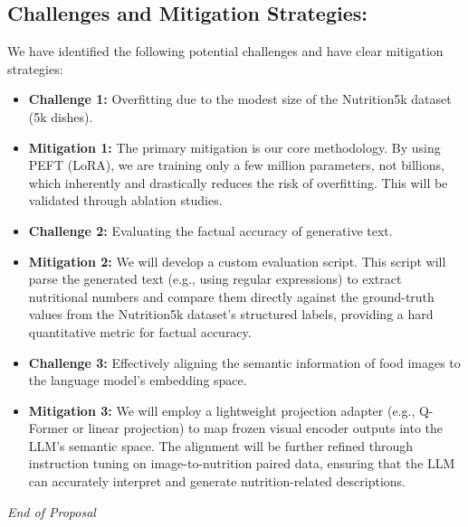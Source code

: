 \documentclass{article}
\begin{document}
\subsection{Challenges and Mitigation Strategies:}
We have identified the following potential challenges and have clear mitigation strategies:
\begin{itemize}
    \item \textbf{Challenge 1:} Overfitting due to the modest size of the Nutrition5k dataset (5k dishes).
    \item \textbf{Mitigation 1:} The primary mitigation is our core methodology. By using PEFT (LoRA), we are training only a few million parameters, not billions, which inherently and drastically reduces the risk of overfitting. This will be validated through ablation studies.
    \item \textbf{Challenge 2:} Evaluating the factual accuracy of generative text.
    \item \textbf{Mitigation 2:} We will develop a custom evaluation script. This script will parse the generated text (e.g., using regular expressions) to extract nutritional numbers and compare them directly against the ground-truth values from the Nutrition5k dataset's structured labels, providing a hard quantitative metric for factual accuracy.
    \item \textbf{Challenge 3:} Effectively aligning the semantic information of food images to the language model's embedding space.
    \item \textbf{Mitigation 3:} We will employ a lightweight projection adapter (e.g., Q-Former or linear projection) to map frozen visual encoder outputs into the LLM's semantic space. The alignment will be further refined through instruction tuning on image-to-nutrition paired data, ensuring that the LLM can accurately interpret and generate nutrition-related descriptions.

    
\end{itemize}

\clearpage


\vfill
\begin{center}
    \textit{End of Proposal}
\end{center}
\end{document}
